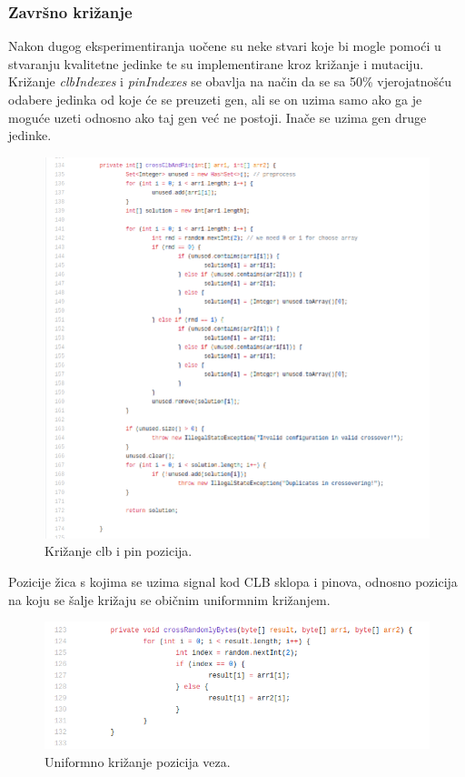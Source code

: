 \documentclass[times, utf8, zavrsni]{fer}
\begin{document}
\subsubsection{Završno križanje}

Nakon dugog eksperimentiranja uočene su neke stvari koje bi mogle pomoći u stvaranju kvalitetne jedinke te su implementirane kroz križanje i mutaciju. Križanje \emph{clbIndexes} i \emph{pinIndexes} se obavlja na način da se sa 50\% vjerojatnošću odabere jedinka od koje će se preuzeti gen, ali se on uzima samo ako ga je moguće uzeti odnosno ako taj gen već ne postoji. Inače se uzima gen druge jedinke.


\begin{figure}[H]
	\centering
	\includegraphics[width=18cm]{slike/crossClbAndPin.png}
	\caption{Križanje clb i pin pozicija.}
	\label{fig:clb-and-pin-positions}
\end{figure} 

Pozicije žica s kojima se uzima signal kod CLB sklopa i pinova, odnosno pozicija na koju se šalje križaju se običnim uniformnim križanjem. 

\begin{figure}[H]
	\centering
	\includegraphics[width=18cm]{slike/crossRandomlyBytes.png}
	\caption{Uniformno križanje pozicija veza.}
	\label{fig:uniform-connection-crossing}
\end{figure} 
\end{document}
